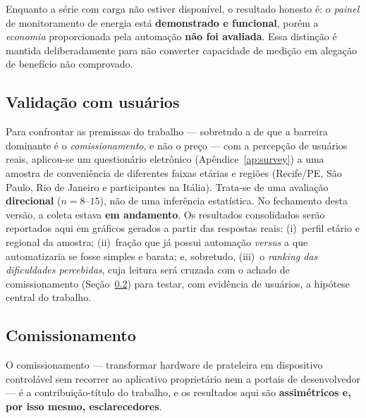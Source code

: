 Enquanto a série com carga não estiver disponível, o resultado honesto é: o
\emph{painel} de monitoramento de energia está \textbf{demonstrado e funcional}, porém a
\emph{economia} proporcionada pela automação \textbf{não foi avaliada}. Essa distinção
é mantida deliberadamente para não converter capacidade de medição em alegação de
benefício não comprovado.

\subsection{Validação com usuários}\label{sec:res-survey}

Para confrontar as premissas do trabalho --- sobretudo a de que a barreira dominante é o
\emph{comissionamento}, e não o preço --- com a percepção de usuários reais, aplicou-se um
questionário eletrônico (Apêndice~\ref{ap:survey}) a uma amostra de conveniência de
diferentes faixas etárias e regiões (Recife/PE, São Paulo, Rio de Janeiro e participantes
na Itália). Trata-se de uma avaliação \textbf{direcional} ($n = 8$--$15$), não de uma
inferência estatística. No fechamento desta versão, a coleta estava \textbf{em andamento}.
Os resultados consolidados serão reportados aqui em gráficos gerados a partir das respostas
reais: (i)~perfil etário e regional da amostra; (ii)~fração que já possui automação
\emph{versus} a que automatizaria se fosse simples e barata; e, sobretudo, (iii)~o
\emph{ranking das dificuldades percebidas}, cuja leitura será cruzada com o achado de
comissionamento (Seção~\ref{sec:res-comissionamento}) para testar, com evidência de
usuários, a hipótese central do trabalho.


\subsection{Comissionamento}\label{sec:res-comissionamento}

O comissionamento --- transformar hardware de prateleira em dispositivo controlável
sem recorrer ao aplicativo proprietário nem a portais de desenvolvedor --- é a
contribuição-título do trabalho, e os resultados aqui são \textbf{assimétricos e, por
isso mesmo, esclarecedores}.

